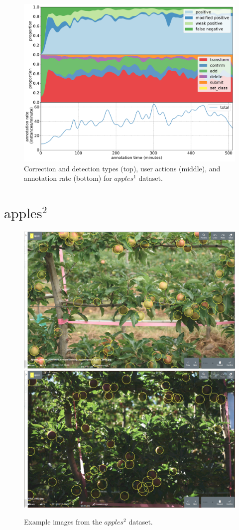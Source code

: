 \begin{figure}[!h]
\centering
\includegraphics[width=1.0\linewidth]{charts/action_annotations/apples1.pdf}
\caption{Correction and detection types (top), user actions (middle), and annotation rate (bottom) for $apples^1$ dataset.}
\label{fig:apples1_annotation}
\end{figure}

\pagebreak
\section{\texorpdfstring{$\mathrm{apples^2}$}{}}
\label{sec:apples2_details}


\begin{figure}[!h]
  \includegraphics[width=0.475\linewidth]{figures/annotation/screenshots/apples2.png}
  \hfill
  \includegraphics[width=0.475\linewidth]{figures/annotation/screenshots/apples2_dark.png}
\caption{Example images from the $apples^2$ dataset.}
\label{fig:apples2_dataset}  
\end{figure}

